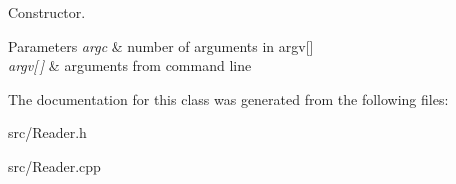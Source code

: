 Constructor. 


\begin{DoxyParams}{Parameters}
{\em argc} & number of arguments in argv\mbox{[}\mbox{]} \\
\hline
{\em argv\mbox{[}$\,$\mbox{]}} & arguments from command line \\
\hline
\end{DoxyParams}


The documentation for this class was generated from the following files\+:\begin{DoxyCompactItemize}
\item 
src/Reader.\+h\item 
src/Reader.\+cpp\end{DoxyCompactItemize}
